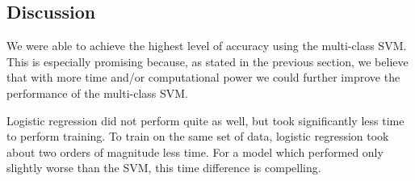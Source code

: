\documentclass{sigchi}
\begin{document}
\subsection{Discussion}

We were able to achieve the highest level of accuracy using the multi-class SVM. This is especially promising because, as stated in the previous section, we believe that with more time and/or computational power we could further improve the performance of the multi-class SVM.

Logistic regression did not perform quite as well, but took significantly less time to perform training. To train on the same set of data, logistic regression took about two orders of magnitude less time. For a model which performed only slightly worse than the SVM, this time difference is compelling.
\end{document}
